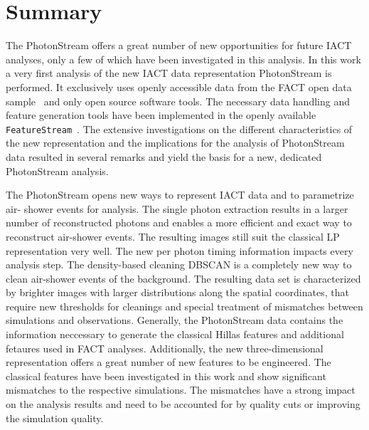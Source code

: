 \chapter{Summary}\label{ch:summary}
%
The PhotonStream offers a great number of new opportunities for future IACT
analyses, only a few of which have been investigated in this analysis.
In this work a very first analysis of the new IACT data representation
PhotonStream is performed. It exclusively uses openly accessible data from the
FACT open data sample~\cite{fact-data} and only open source software tools. The
necessary data handling and feature generation tools have been implemented in
the openly available \texttt{FeatureStream}~\cite{FeatureStream}. The extensive
investigations on the different characteristics of the new representation and
the implications for the analysis of PhotonStream data resulted in several
remarks and yield the basis for a new, dedicated PhotonStream analysis.

The PhotonStream opens new ways to represent IACT data and to parametrize air-
shower events for analysis. The single photon extraction results in a larger
number of reconstructed photons and enables a more efficient and exact way to
reconstruct air-shower events. The resulting images still suit the classical LP
representation very well. The new per photon timing information impacts every
analysis step. The density-based cleaning DBSCAN is a completely new way to
clean air-shower events of the background. The resulting data set is
characterized by brighter images with larger distributions along the spatial
coordinates, that require new thresholds for cleanings and special treatment of mismatches between simulations and observations. Generally, the PhotonStream data contains the
information neccessary to generate the classical Hillas features and additional
fetaures used in FACT analyses. Additionally, the new three-dimensional
representation offers a great number of new features to be engineered. The
classical features have been investigated in this work and show significant
mismatches to the respective simulations. The mismatches have a strong impact
on the analysis results and need to be accounted for by quality cuts or
improving the simulation quality.

